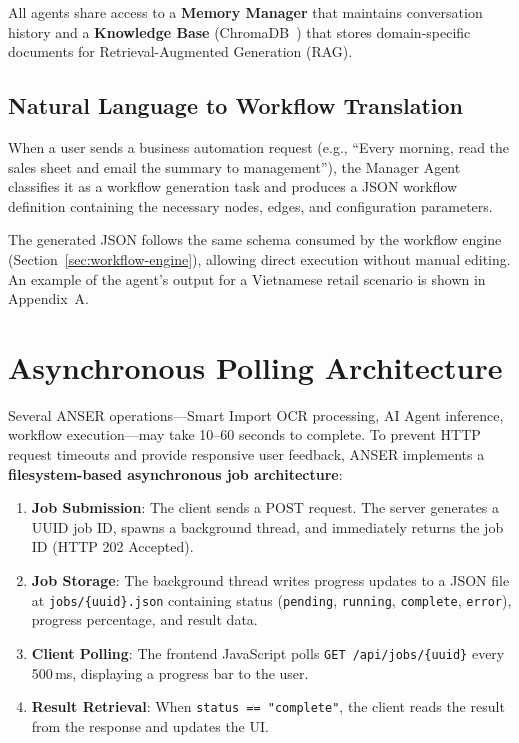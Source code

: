 \documentclass[11pt,a4paper]{report}
\begin{document}
All agents share access to a \textbf{Memory Manager} that maintains conversation history and a \textbf{Knowledge Base} (ChromaDB~\cite{chromadb}) that stores domain-specific documents for Retrieval-Augmented Generation (RAG).

\subsection{Natural Language to Workflow Translation}

When a user sends a business automation request (e.g., ``Every morning, read the sales sheet and email the summary to management''), the Manager Agent classifies it as a workflow generation task and produces a JSON workflow definition containing the necessary nodes, edges, and configuration parameters.

The generated JSON follows the same schema consumed by the workflow engine (Section~\ref{sec:workflow-engine}), allowing direct execution without manual editing. An example of the agent's output for a Vietnamese retail scenario is shown in Appendix~A.

\section{Asynchronous Polling Architecture}
\label{sec:async}

Several ANSER operations---Smart Import OCR processing, AI Agent inference, workflow execution---may take 10--60 seconds to complete. To prevent HTTP request timeouts and provide responsive user feedback, ANSER implements a \textbf{filesystem-based asynchronous job architecture}:

\begin{enumerate}
  \item \textbf{Job Submission}: The client sends a POST request. The server generates a UUID job ID, spawns a background thread, and immediately returns the job ID (HTTP 202 Accepted).
  \item \textbf{Job Storage}: The background thread writes progress updates to a JSON file at \texttt{jobs/\{uuid\}.json} containing status (\texttt{pending}, \texttt{running}, \texttt{complete}, \texttt{error}), progress percentage, and result data.
  \item \textbf{Client Polling}: The frontend JavaScript polls \texttt{GET /api/jobs/\{uuid\}} every 500\,ms, displaying a progress bar to the user.
  \item \textbf{Result Retrieval}: When \texttt{status == "complete"}, the client reads the result from the response and updates the UI.
\end{enumerate}
\end{document}
